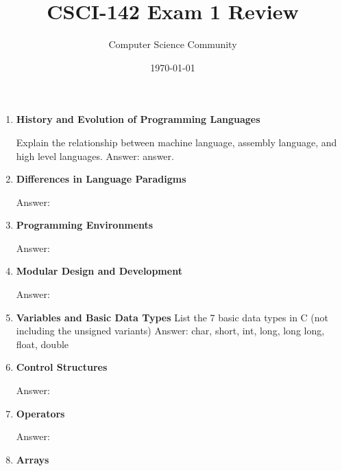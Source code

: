 \documentclass[11pt]{article}
\title{CSCI-142 Exam 1 Review}
\author{Computer Science Community}
\date{\today}
\newenvironment{answer}{\large\lstset{basicstyle=\tiny\ttfamily}\color{white} \small{Answer:}}{}
\newenvironment{answer}{\large\lstset{basicstyle=\large\ttfamily}\color{red} \small{Answer:}}{}
\begin{document}
\header
	\begin{enumerate}

\item \textbf{History and Evolution of Programming Languages}

Explain the relationship between machine language, assembly language, and high level languages.
\begin{answer}
answer.
\end{answer}



\item \textbf{Differences in Language Paradigms}

\begin{answer}
\end{answer}



\item \textbf{Programming Environments}

\begin{answer}
\end{answer}



\item \textbf{Modular Design and Development}

\begin{answer}
\end{answer}



\item \textbf{Variables and Basic Data Types}
List the 7 basic data types in C (not including the unsigned variants)
\begin{answer}
char, short, int, long, long long, float, double
\end{answer}



\item \textbf{Control Structures}

\begin{answer}
\end{answer}



\item \textbf{Operators}

\begin{answer}
\end{answer}



\item \textbf{Arrays}


\end{enumerate}
\end{document}
